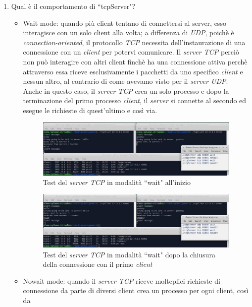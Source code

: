 \documentclass[a4paper, 12pt]{report}
\begin{document}
\begin{enumerate}
\begin{itemize}
\begin{figure}[H]
		\end{figure}
	\end{itemize}
	\item Qual è il comportamento di ``tcpServer"?
	\begin{itemize}
		\item Wait mode: quando più client tentano di connettersi al server, esso interagisce con un solo client alla volta; a differenza di \textit{UDP},
		poichè è \textit{connection-oriented}, il protocollo \textit{TCP} necessita dell'instaurazione di una connessione con un \textit{client} per potervi comunicare.
		Il \textit{server TCP} perciò non può interagire con altri client finchè ha una connessione attiva perchè attraverso essa riceve esclusivamente i pacchetti da uno
		specifico \textit{client} e nessun altro, al contrario di come avevamo visto per il \textit{server UDP}. Anche in questo caso, il \textit{server TCP} crea un solo
		processo e dopo la terminazione del primo processo \textit{client}, il \textit{server} si connette al secondo ed esegue le richieste di quest'ultimo e così via.
		\begin{figure}[H]
			\centering
			\includegraphics[width=\linewidth]{images/launch_tcpClientWait.JPG}
			\caption{Test del \textit{server TCP} in modalità ``wait" all'inizio}
		\end{figure}
		\begin{figure}[H]
			\centering
			\includegraphics[width=\linewidth]{images/launch_tcpClientWait_2.JPG}
			\caption{Test del \textit{server TCP} in modalità ``wait" dopo la chiusura della connessione con il primo \textit{client}}
		\end{figure}
		\item Nowait mode: quando il \textit{server TCP} riceve molteplici richieste di connessione da parte di diversi client crea un processo per ogni client, così da

\end{itemize}
\end{enumerate}
\end{document}
